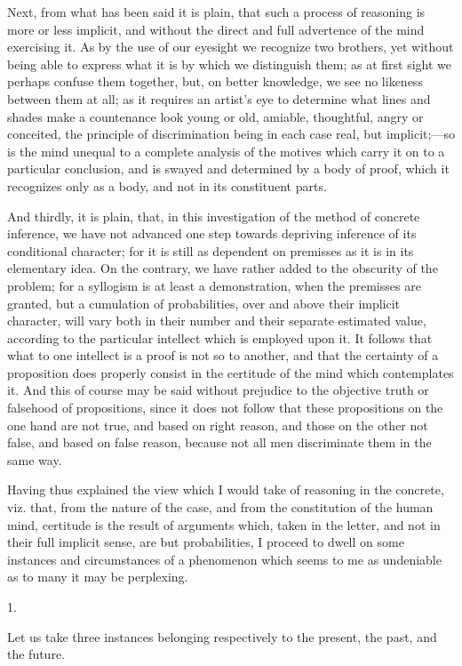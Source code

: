Next, from what has been said it is plain, that such a process of
reasoning is more or less implicit, and without the direct and full
advertence of the mind exercising it. As by the use of our eyesight we
recognize two brothers, yet without being able to express what it is
by which we distinguish them; as at first sight we perhaps confuse
them together, but, on better knowledge, we see no likeness between
them at all; as it requires an artist's eye to determine what lines
and shades make a countenance look young or old, amiable, thoughtful,
angry or conceited, the principle of discrimination being in each case
real, but implicit;—so is the mind unequal to a complete analysis of
the motives which carry it on to a particular conclusion, and is
swayed and determined by a body of proof, which it recognizes only as
a body, and not in its constituent parts.

And thirdly, it is plain, that, in this investigation of the method
of concrete inference, we have not advanced one step towards depriving
inference of its conditional character; for it is still as dependent
on premisses as it is in its elementary idea. On the contrary, we have
rather added to the obscurity of the problem; for a syllogism is at
least a demonstration, when the premisses are granted, but a
cumulation of probabilities, over and above their implicit character,
will vary both in their number and their separate estimated value,
according to the particular intellect which is employed upon it. It
follows that what to one intellect is a proof is not so to another,
and that the certainty of a proposition does properly consist in the
certitude of the mind which contemplates it. And this of course may be
said without prejudice to the objective truth or falsehood of
propositions, since it does not follow that these propositions on the
one hand are not true, and based on right reason, and those on the
other not false, and based on false reason, because not all men
discriminate them in the same way.

Having thus explained the view which I would take of reasoning in
the concrete, viz. that, from the nature of the case, and from the
constitution of the human mind, certitude is the result of arguments
which, taken in the letter, and not in their full implicit sense, are
but probabilities, I proceed to dwell on some instances and
circumstances of a phenomenon which seems to me as undeniable as to
many it may be perplexing.

1.

Let us take three instances belonging respectively to the present,
the past, and the future.

